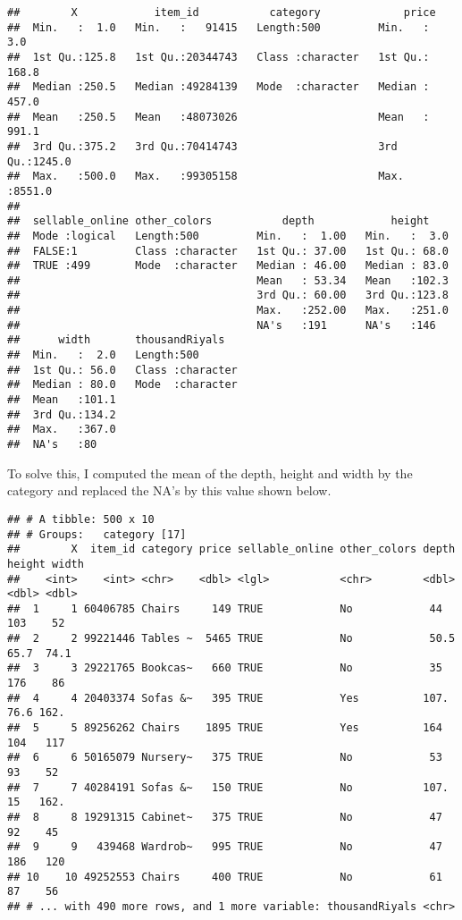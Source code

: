\documentclass[
]{article}
\begin{document}
\begin{verbatim}
##        X            item_id           category             price       
##  Min.   :  1.0   Min.   :   91415   Length:500         Min.   :   3.0  
##  1st Qu.:125.8   1st Qu.:20344743   Class :character   1st Qu.: 168.8  
##  Median :250.5   Median :49284139   Mode  :character   Median : 457.0  
##  Mean   :250.5   Mean   :48073026                      Mean   : 991.1  
##  3rd Qu.:375.2   3rd Qu.:70414743                      3rd Qu.:1245.0  
##  Max.   :500.0   Max.   :99305158                      Max.   :8551.0  
##                                                                        
##  sellable_online other_colors           depth            height     
##  Mode :logical   Length:500         Min.   :  1.00   Min.   :  3.0  
##  FALSE:1         Class :character   1st Qu.: 37.00   1st Qu.: 68.0  
##  TRUE :499       Mode  :character   Median : 46.00   Median : 83.0  
##                                     Mean   : 53.34   Mean   :102.3  
##                                     3rd Qu.: 60.00   3rd Qu.:123.8  
##                                     Max.   :252.00   Max.   :251.0  
##                                     NA's   :191      NA's   :146    
##      width       thousandRiyals    
##  Min.   :  2.0   Length:500        
##  1st Qu.: 56.0   Class :character  
##  Median : 80.0   Mode  :character  
##  Mean   :101.1                     
##  3rd Qu.:134.2                     
##  Max.   :367.0                     
##  NA's   :80
\end{verbatim}

To solve this, I computed the mean of the depth, height and width by the
category and replaced the NA's by this value shown below.

\begin{verbatim}
## # A tibble: 500 x 10
## # Groups:   category [17]
##        X  item_id category price sellable_online other_colors depth height width
##    <int>    <int> <chr>    <dbl> <lgl>           <chr>        <dbl>  <dbl> <dbl>
##  1     1 60406785 Chairs     149 TRUE            No            44    103    52  
##  2     2 99221446 Tables ~  5465 TRUE            No            50.5   65.7  74.1
##  3     3 29221765 Bookcas~   660 TRUE            No            35    176    86  
##  4     4 20403374 Sofas &~   395 TRUE            Yes          107.    76.6 162. 
##  5     5 89256262 Chairs    1895 TRUE            Yes          164    104   117  
##  6     6 50165079 Nursery~   375 TRUE            No            53     93    52  
##  7     7 40284191 Sofas &~   150 TRUE            No           107.    15   162. 
##  8     8 19291315 Cabinet~   375 TRUE            No            47     92    45  
##  9     9   439468 Wardrob~   995 TRUE            No            47    186   120  
## 10    10 49252553 Chairs     400 TRUE            No            61     87    56  
## # ... with 490 more rows, and 1 more variable: thousandRiyals <chr>
\end{verbatim}
\end{document}
